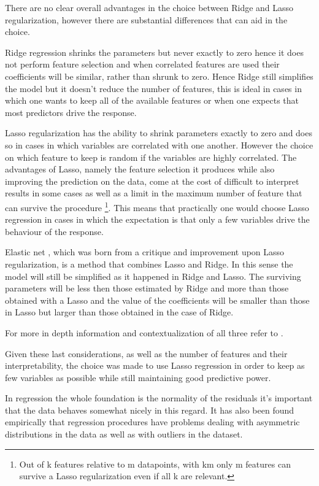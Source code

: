 There are no clear overall advantages in the choice between Ridge and Lasso regularization, however there are substantial differences that can aid in the choice.

Ridge regression shrinks the parameters but never exactly to zero hence it does not perform feature selection and when correlated features are used their coefficients will be similar, rather than shrunk to zero.
Hence Ridge still simplifies the model but it doesn't reduce the number of features, this is ideal in cases in which one wants to keep all of the available features or when one expects that most predictors drive the response.

Lasso regularization has the ability to shrink parameters exactly to zero and does so in cases in which variables are correlated with one another. However the choice on which feature to keep is random if the variables are highly correlated. 
The advantages of Lasso, namely the feature selection it produces while also improving the prediction on the data, come at the cost of difficult to interpret results in some cases as well as a limit in the maximum number of feature that can survive the procedure
\footnote{Out of k features relative to m datapoints, with k\>m only m features can survive a Lasso regularization even if all k are relevant.}.
This means that practically one would choose Lasso regression in cases in which the expectation is that only a few variables drive the behaviour of the response.

Elastic net \cite{ElasticNet}, which was born from a critique and improvement upon Lasso regularization, is a method that combines Lasso and Ridge.
In this sense the model will still be simplified as it happened in Ridge and Lasso.
The surviving parameters will be less then those estimated by Ridge and more than those obtained with a Lasso and the value of the coefficients will be smaller than those in Lasso but larger than those obtained in the case of Ridge.

For more in depth information and contextualization of all three refer to \cite{StatisticalLearning}.

Given these last considerations, as well as the number of features and their interpretability, the choice was made to use Lasso regression in order to keep as few variables as possible while still maintaining good predictive power.

In regression the whole foundation is the normality of the residuals it's important that the data behaves somewhat nicely in this regard.
It has also been found empirically that regression procedures have problems dealing with asymmetric distributions in the data as well as with outliers in the dataset. 

